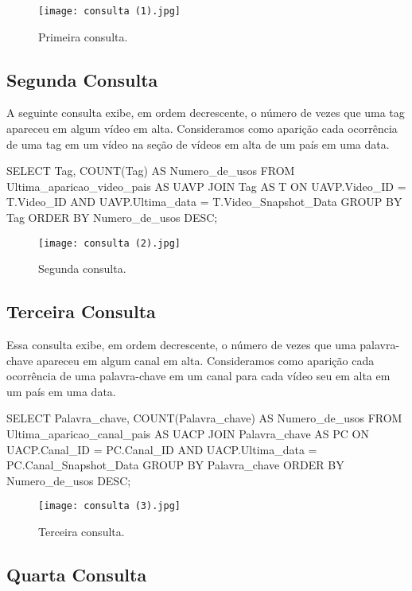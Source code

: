 \begin{figure}[H]
  \centering
  \texttt{[image: consulta (1).jpg]}
  \caption{Primeira consulta.}
\end{figure}

\subsection{Segunda Consulta}

  A seguinte consulta exibe, em ordem decrescente, o número de vezes que uma tag apareceu em algum vídeo em alta. Consideramos como aparição cada ocorrência de uma tag em um vídeo na seção de vídeos em alta de um país em uma data.

\begin{code}
SELECT Tag, COUNT(Tag) AS Numero_de_usos
FROM Ultima_aparicao_video_pais AS UAVP JOIN
    Tag AS T ON UAVP.Video_ID = T.Video_ID AND
          UAVP.Ultima_data = T.Video_Snapshot_Data
GROUP BY Tag
ORDER BY Numero_de_usos DESC;
\end{code}

\begin{figure}[H]
  \centering
  \texttt{[image: consulta (2).jpg]}
  \caption{Segunda consulta.}
\end{figure}

\subsection{Terceira Consulta}

  Essa consulta exibe, em ordem decrescente, o número de vezes que uma palavra-chave apareceu em algum canal em alta. Consideramos como aparição cada ocorrência de uma palavra-chave em um canal para cada vídeo seu em alta em um país em uma data.

\begin{code}
SELECT Palavra_chave, COUNT(Palavra_chave) AS Numero_de_usos
FROM Ultima_aparicao_canal_pais AS UACP JOIN
    Palavra_chave AS PC ON UACP.Canal_ID = PC.Canal_ID AND
                  UACP.Ultima_data = PC.Canal_Snapshot_Data
GROUP BY Palavra_chave
ORDER BY Numero_de_usos DESC;
\end{code}

\begin{figure}[H]
  \centering
  \texttt{[image: consulta (3).jpg]}
  \caption{Terceira consulta.}
\end{figure}

\subsection{Quarta Consulta}

